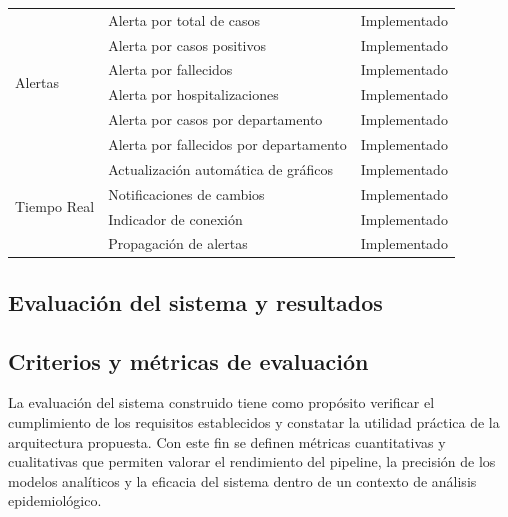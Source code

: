 \documentclass[12pt,a4paper]{article}
\begin{document}
\begin{table}[H]
\begin{tabular}{@{}lp{7cm}l@{}}
        \multirow{6}{*}{Alertas}         & Alerta por total de casos                             & Implementado    \\
                                         & Alerta por casos positivos                            & Implementado    \\
                                         & Alerta por fallecidos                                 & Implementado    \\
                                         & Alerta por hospitalizaciones                          & Implementado    \\
                                         & Alerta por casos por departamento                     & Implementado    \\
                                         & Alerta por fallecidos por departamento                & Implementado    \\
        \midrule
        \multirow{4}{*}{Tiempo Real}     & Actualización automática de gráficos                  & Implementado    \\
                                         & Notificaciones de cambios                             & Implementado    \\
                                         & Indicador de conexión                                 & Implementado    \\
                                         & Propagación de alertas                                & Implementado    \\
        \bottomrule
    \end{tabular}
\end{table}

\subsection{Evaluación del sistema y resultados}\label{evaluaciuxf3n-del-sistema-y-resultados}

\subsection{Criterios y métricas de evaluación}\label{criterios-y-muxe9tricas-de-evaluaciuxf3n}

La evaluación del sistema construido tiene como propósito verificar el cumplimiento de los requisitos establecidos y constatar la utilidad práctica de la arquitectura propuesta. Con este fin se definen métricas cuantitativas y cualitativas que permiten valorar el rendimiento del pipeline, la precisión de los modelos analíticos y la eficacia del sistema dentro de un contexto de análisis epidemiológico.
\end{document}

